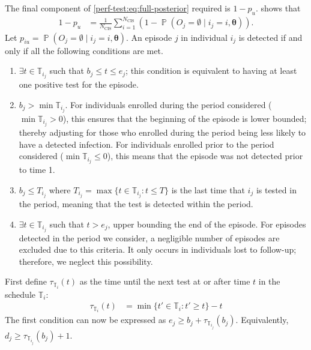 \documentclass[12pt]{article}
\makeatletter
\DeclareMathOperator{\prob}{\mathbb{P}}
\renewcommand{\vec}[1]{\bm{#1}}
\newcommand{\ssep}{:}
\newcommand{\Ncis}{N_\text{CIS}}
\newcommand{\sched}{\mathbb{T}}
\DeclareRobustCommand\onedot{\futurelet\@let@token\@onedot}
\def\@onedot{\ifx\@let@token.\else.\null\fi\xspace}
\def\ie{i.e\onedot} \def\Ie{{I.e}\onedot}
\makeatother
\begin{document}
The final component of \cref{perf-test:eq:full-posterior} required is $1 - p_u$.
 shows that
\begin{align}
  1 - p_u
  &= \frac{1}{\Ncis} \sum_{i=1}^{\Ncis} (1 - \prob(O_j = \emptyset \mid i_j = i, \vec{\theta})).
  \label{perf-test:eq:pu}
\end{align}
Let $p_{iu} = \prob(O_j = \emptyset \mid i_j = i, \vec{\theta})$.
An episode $j$ in individual $i_j$ is detected if and only if all the following conditions are met.
\begin{enumerate}
    \item $\exists t \in \sched_{i_j}$ such that $b_j \leq t \leq e_j$; this condition is equivalent to having at least one positive test for the episode.
    \item $b_j > \min \sched_{i_j}$.
      For individuals enrolled during the period considered ($\min \sched_{i_j} > 0$), this ensures that the beginning of the episode is lower bounded; thereby adjusting for those who enrolled during the period being less likely to have a detected infection.
      For individuals enrolled prior to the period considered ($\min \sched_{i_j} \leq 0$), this means that the episode was not detected prior to time 1.
    \item $b_j \leq T_{i_j}$ where $T_{i_j} = \max \{ t \in \sched_{i_j} \ssep t \leq T \}$ is the last time that $i_j$ is tested in the period, meaning that the test is detected within the period.
    \item $\exists t \in \sched_{i_j}$ such that $t > e_j$, upper bounding the end of the episode.
      For episodes detected in the period we consider, a negligible number of episodes are excluded due to this criteria.
      It only occurs in individuals lost to follow-up; therefore, we neglect this possibility.
\end{enumerate}

First define $\tau_{\sched_i}(t)$ as the time until the next test at or after time $t$ in the schedule $\sched_i$:
\begin{align}
\tau_{\sched_i}(t) &= \min \{ t' \in \sched_i : t' \geq t \} - t
\label{perf-test:eq:tau-def}
\end{align}
The first condition can now be expressed as $e_j \geq b_j + \tau_{\sched_{i_j}}(b_j)$.
Equivalently, $d_j \geq \tau_{\sched_{i_j}}(b_j) + 1$.
\end{document}
